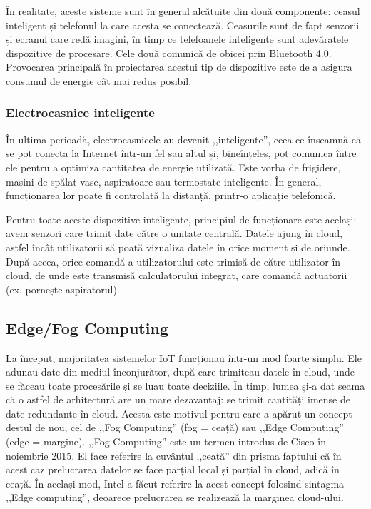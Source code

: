 În realitate, aceste sisteme sunt în general alcătuite din două componente:
ceasul inteligent și telefonul la care acesta se conectează. Ceasurile sunt de
fapt senzorii și ecranul care redă imagini, în timp ce telefoanele inteligente
sunt adevăratele dispozitive de procesare. Cele două comunică de obicei prin
Bluetooth 4.0. Provocarea principală în proiectarea acestui tip de dispozitive
este de a asigura consumul de energie cât mai redus posibil.

\subsubsection{Electrocasnice inteligente}
\label{sec:embed:iot:impl:home}

În ultima perioadă, electrocasnicele au devenit ,,inteligente'', ceea ce înseamnă
că se pot conecta la Internet într-un fel sau altul și, bineînțeles, pot
comunica între ele pentru a optimiza cantitatea de energie utilizată. Este vorba
de frigidere, mașini de spălat vase, aspiratoare sau termostate
inteligente. În general, funcționarea lor poate fi controlată la distanță,
printr-o aplicație telefonică.

Pentru toate aceste dispozitive inteligente, principiul de funcționare este
același: avem senzori care trimit date către o unitate centrală. Datele ajung în
cloud, astfel încât utilizatorii să poată vizualiza datele în orice moment și de
oriunde. După aceea, orice comandă a utilizatorului este trimisă de către
utilizator în cloud, de unde este transmisă calculatorului integrat, care
comandă actuatorii (ex. pornește aspiratorul).

\subsection{Edge/Fog Computing}
\label{sec:embed-iot-edge}

La început, majoritatea sistemelor IoT funcționau într-un mod foarte simplu. Ele
adunau date din mediul înconjurător, după care trimiteau datele în cloud, unde
se făceau toate procesările și se luau toate deciziile. În timp, lumea și-a dat
seama că o astfel de arhitectură are un mare dezavantaj: se trimit cantități
imense de date redundante în cloud. Acesta este motivul pentru care a apărut un
concept destul de nou, cel de ,,Fog Computing'' (fog = ceață) sau ,,Edge Computing''
(edge = margine). ,,Fog Computing'' este un termen introdus de Cisco în noiembrie
2015. El face referire la cuvântul ,,ceață'' din prisma faptului că în acest caz
prelucrarea datelor se face parțial local și parțial în cloud,
adică în ceață. În același mod, Intel a făcut referire la acest concept folosind
sintagma ,,Edge computing'', deoarece prelucrarea se realizează la marginea
cloud-ului.

